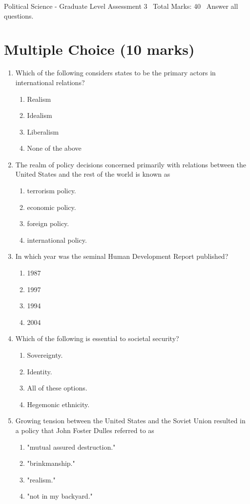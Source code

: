 \documentclass[12pt]{article}
\begin{document}
\begin{center}
Political Science - Graduate Level Assessment 3 \
Total Marks: 40 \
Answer all questions.
\end{center}

\section*{Multiple Choice (10 marks)}
\begin{enumerate}[label=\arabic*.]
\item Which of the following considers states to be the primary actors in international relations?
\begin{enumerate}[label=(\alph*)]
    \item Realism
    \item Idealism
    \item Liberalism
    \item None of the above
\end{enumerate}
\item The realm of policy decisions concerned primarily with relations between the United States and the rest of the world is known as
\begin{enumerate}[label=(\alph*)]
    \item terrorism policy.
    \item economic policy.
    \item foreign policy.
    \item international policy.
\end{enumerate}
\item In which year was the seminal Human Development Report published?
\begin{enumerate}[label=(\alph*)]
    \item 1987
    \item 1997
    \item 1994
    \item 2004
\end{enumerate}
\item Which of the following is essential to societal security?
\begin{enumerate}[label=(\alph*)]
    \item Sovereignty.
    \item Identity.
    \item All of these options.
    \item Hegemonic ethnicity.
\end{enumerate}
\item Growing tension between the United States and the Soviet Union resulted in a policy that John Foster Dulles referred to as
\begin{enumerate}[label=(\alph*)]
    \item "mutual assured destruction."
    \item "brinkmanship."
    \item "realism."
    \item "not in my backyard."
\end{enumerate}
\end{enumerate}
\end{document}
